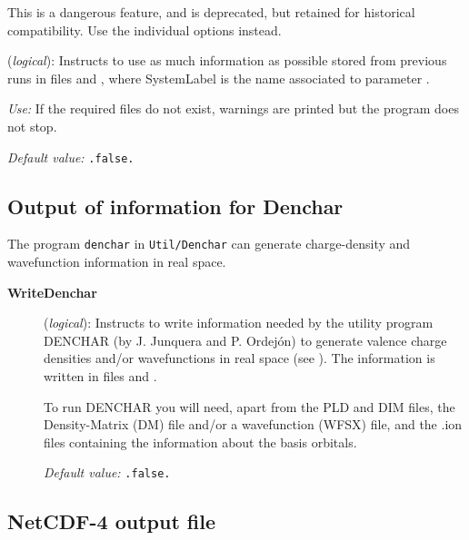 This is a dangerous feature, and is deprecated, but retained for
historical compatibility. Use the individual options instead.

\begin{description}
\itemsep 10pt
\parsep 0pt


\item[\textbf{UseSaveData}] (\textit{logical}):   Instructs to use as
  much information as possible stored from previous runs in files 
   and ,
  where SystemLabel is the name associated to parameter .

\textit{Use:} If the required files do not exist, warnings are
printed but the program does not stop.

\textit{Default value:} \texttt{.false.}

\end{description}

\vspace{5pt}
\subsection{Output of information for Denchar}

The program \texttt{denchar} in \texttt{Util/Denchar} can generate
charge-density and wavefunction information in real space.

\begin{description}

  \item[\textbf{WriteDenchar}] (\textit{logical}):
    Instructs to write information
  needed by the utility program DENCHAR (by J. Junquera and
  P. Ordej\'on) to generate valence charge densities and/or
  wavefunctions in real space (see ). The
  information is written in files  and .

To run DENCHAR you will need, apart from the PLD and DIM files,
the Density-Matrix (DM) file and/or a wavefunction (WFSX)
file, and the .ion files containing the information about the basis
orbitals.

\textit{Default value:} \texttt{.false.}

\end{description}


\subsection{NetCDF-4 output file}
\label{cdf-output}

